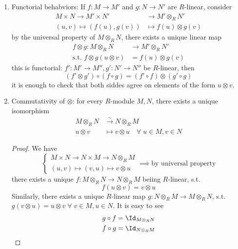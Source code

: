\begin{remark}
	\leavevmode
	\begin{enumerate}
		\item Functorial behabviors: If \( f: M \to M' \) and \( g: N \to N' \) are \( R \)-linear,
		      consider
		      \[
			      \begin{aligned}
				      M \times N \to M' \times N' & \to M' \otimes_R N'       \\
				      (u,v) \mapsto (f(u),g(v))   & \mapsto f(u) \otimes g(v)
			      \end{aligned}
		      \]
		      by the universal property of \( M \otimes_R N \), there exists a unique linear map
		      \[
			      \begin{aligned}
				      f\otimes g: M \otimes_R N            & \to M'\otimes_R N'  \\
				      \text{s.t. } f\otimes g (u\otimes v) & = f(u) \otimes g(v)
			      \end{aligned}
		      \]
		      this is functorial: \( f': M' \to M'' , g': N' \to N'' \) be \( R \)-linear, then
		      \[
			      (f'\otimes g') \circ (f\circ g) = (f'\circ f) \otimes (g'\circ g)
		      \]
		      it is enough to check that both siddes agree on elements of the form \( u\otimes v \).
		\item Commutativity of \( \otimes \): for every \( R \)-module \( M,N \), there exists a unique
		      isomorphism
		      \[
			      \begin{aligned}
				      M \otimes_R N & \xrightarrow{\sim} N \otimes_R M                    \\
				      u\otimes v    & \mapsto v \otimes u \quad \forall \; u\in M, v\in N
			      \end{aligned}
		      \]
		      \begin{proof}
			      We have
			      \[
				      \begin{cases}
					      M \times N \to N \times M \to N \otimes_R M \\
					      (u,v) \mapsto (v,u) \mapsto v\otimes u
				      \end{cases} \implies \text{by universal property}
			      \]
			      there exists a unique \( f: M\otimes_R N \to N \otimes_R M \) beiing \( R \)-linear, s.t.
			      \[
				      f(u\otimes v) = v\otimes u
			      \]
			      Similarly, there exists a unique \( R \)-linear map \( g: N\otimes_R M \to M \otimes_R N \),
			      s.t. \( g(v\otimes u) = u\otimes v \; \forall \; v\in M, u \in N\). It is easy to see
			      \[
				      \begin{aligned}
					      g\circ f & = \Id_{M\otimes_R N} \\
					      f\circ g & = \Id_{N\otimes_R M}
				      \end{aligned}
			      \]
		      \end{proof}


\end{enumerate}
\end{remark}
